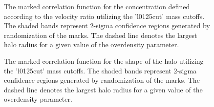 \documentclass[usenatbib,usegraphicx,letterpaper]{mn2e}
\begin{document}
\begin{figure}
	\centering
	\caption{The marked correlation function for the concentration defined according to the velocity ratio utilizing the 'l0125cut' mass cutoffs. The shaded bands represent 2-sigma confidence regions generated by randomization of the marks. The dashed line denotes the largest halo radius for a given value of the overdensity parameter.}
\end{figure}

\begin{figure}
	\centering
	\caption{The marked correlation function for the shape of the halo utilizing the 'l0125cut' mass cutoffs. The shaded bands represent 2-sigma confidence regions generated by randomization of the marks. The dashed line denotes the largest halo radius for a given value of the overdensity parameter.}
\end{figure}
\end{document}
